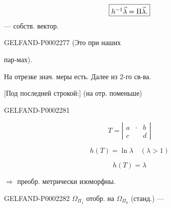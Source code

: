 \begin{equation*}
 \fbox{$h^{-1}\vec\lambda=\Pi\vec\lambda$.}
\end{equation*}
— собств. вектор.



\begin{GelfandAdjacentEvidence}{GELFAND-P000227}{7}
(Это при наших


пар-мах).



На отрезке знач. меры есть. Далее из 2-го св-ва.

[Под последней строкой:] (на отр. поменьше)
\end{GelfandAdjacentEvidence}







\begin{GelfandAdjacentEvidence}{GELFAND-P000228}{1}


\begin{equation*}
 T=\left|\begin{array}{ccc}a&\cdot&b\\c&&d\end{array}\right|
\end{equation*}



\begin{equation*}
 h(T)=\ln\lambda\quad(\lambda>1)
\end{equation*}



\begin{equation*}
 h(T)=\lambda
\end{equation*}
\end{GelfandAdjacentEvidence}



$\Rightarrow$ преобр. метрически изоморфны.

\begin{GelfandAdjacentEvidence}{GELFAND-P000228}{2}
$\Omega_{\Pi_1}$ отобр. на $\Omega_{\Pi_0}$ (станд.) —



\end{GelfandAdjacentEvidence}


